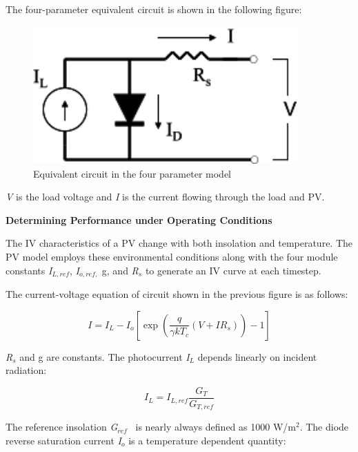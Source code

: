 The four-parameter equivalent circuit is shown in the following figure:

\begin{figure}[hbtp] %
\centering
\includegraphics[width=0.9\textwidth, height=0.9\textheight, keepaspectratio=true]{media/image7592.svg.png}
\caption{Equivalent circuit in the four parameter model \protect \label{fig:equivalent-circuit-in-the-four-parameter}}
\end{figure}

\emph{V} is the load voltage and \emph{I} is the current flowing through the load and PV.

\textbf{Determining Performance under Operating Conditions}

The IV characteristics of a PV change with both insolation and temperature. The PV model employs these environmental conditions along with the four module constants \emph{I\(_{L,ref}\)}, \emph{I\(_{o,ref,}\)} g, and \emph{R\(_{s}\)} to generate an IV curve at each timestep.

The current-voltage equation of circuit shown in the previous figure is as follows:

\begin{equation}
I = {I_L} - {I_o}\left[ {\exp \left( {\frac{q}{{\gamma k{T_c}}}\left( {V + I{R_s}} \right)} \right) - 1} \right]
\end{equation}

\emph{R\(_{s}\)} and g are constants. The photocurrent \emph{I\(_{L}\)} depends linearly on incident radiation:

\begin{equation}
{I_L} = {I_{L,ref}}\frac{{{G_T}}}{{{G_{T,ref}}}}
\end{equation}

The reference insolation \emph{G\(_{ref}\)} ~is nearly always defined as 1000 W/m\(^{2}\). The diode reverse saturation current \emph{I\(_{o}\)} is a temperature dependent quantity:

